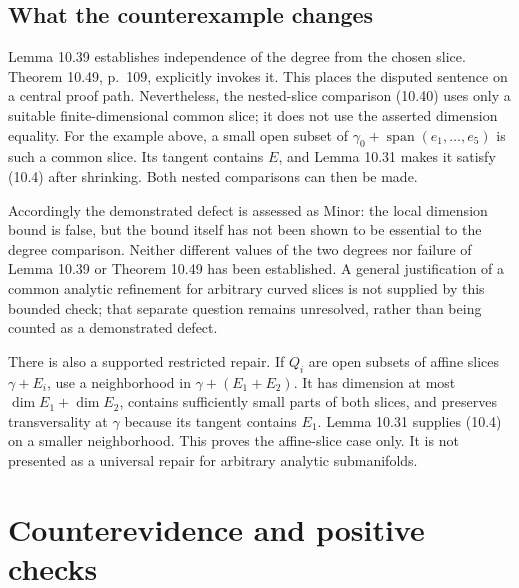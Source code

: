 \documentclass[10pt]{article}
\begin{document}
\subsection*{What the counterexample changes}
Lemma 10.39 establishes independence of the degree from the chosen slice. Theorem 10.49, p. 109, explicitly invokes it. This places the disputed sentence on a central proof path. Nevertheless, the nested-slice comparison (10.40) uses only a suitable finite-dimensional common slice; it does not use the asserted dimension equality. For the example above, a small open subset of \(\gamma_0+\operatorname{span}(e_1,\ldots,e_5)\) is such a common slice. Its tangent contains \(E\), and Lemma 10.31 makes it satisfy (10.4) after shrinking. Both nested comparisons can then be made.\par
Accordingly the demonstrated defect is assessed as Minor: the local dimension bound is false, but the bound itself has not been shown to be essential to the degree comparison. Neither different values of the two degrees nor failure of Lemma 10.39 or Theorem 10.49 has been established. A general justification of a common analytic refinement for arbitrary curved slices is not supplied by this bounded check; that separate question remains unresolved, rather than being counted as a demonstrated defect.\par
There is also a supported restricted repair. If \(Q_i\) are open subsets of affine slices \(\gamma+E_i\), use a neighborhood in \(\gamma+(E_1+E_2)\). It has dimension at most \(\dim E_1+\dim E_2\), contains sufficiently small parts of both slices, and preserves transversality at \(\gamma\) because its tangent contains \(E_1\). Lemma 10.31 supplies (10.4) on a smaller neighborhood. This proves the affine-slice case only. It is not presented as a universal repair for arbitrary analytic submanifolds.\par
\section*{Counterevidence and positive checks}
\end{document}
